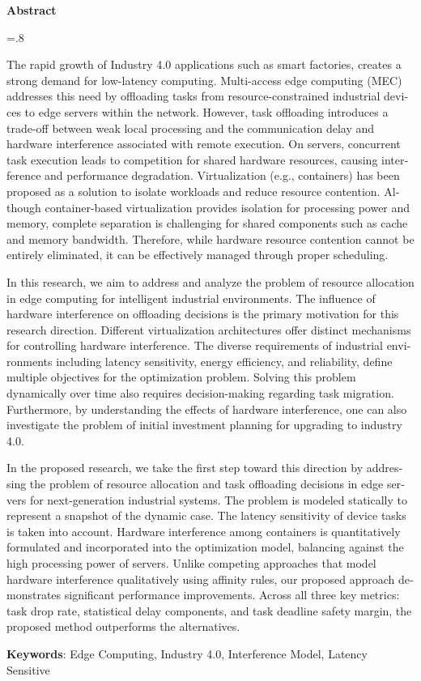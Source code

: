 

\begin{latin}

\begin{center}
\textbf{Abstract}
\end{center}
\baselineskip=.8\baselineskip

The rapid growth of Industry 4.0 applications such as smart factories, creates a strong demand for low-latency computing. Multi-access edge computing (MEC) addresses this need by offloading tasks from resource-constrained industrial devices to edge servers within the network. However, task offloading introduces a trade-off between weak local processing and the communication delay and hardware interference associated with remote execution. On servers, concurrent task execution leads to competition for shared hardware resources, causing interference and performance degradation. Virtualization (e.g., containers) has been proposed as a solution to isolate workloads and reduce resource contention. Although container-based virtualization provides isolation for processing power and memory, complete separation is challenging for shared components such as cache and memory bandwidth. Therefore, while hardware resource contention cannot be entirely eliminated, it can be effectively managed through proper scheduling.

In this research, we aim to address and analyze the problem of resource allocation in edge computing for intelligent industrial environments. The influence of hardware interference on offloading decisions is the primary motivation for this research direction. Different virtualization architectures offer distinct mechanisms for controlling hardware interference. The diverse requirements of industrial environments including latency sensitivity, energy efficiency, and reliability, define multiple objectives for the optimization problem. Solving this problem dynamically over time also requires decision-making regarding task migration. Furthermore, by understanding the effects of hardware interference, one can also investigate the problem of initial investment planning for upgrading to industry 4.0.

In the proposed research, we take the first step toward this direction by addressing the problem of resource allocation and task offloading decisions in edge servers for next-generation industrial systems. The problem is modeled statically to represent a snapshot of the dynamic case. The latency sensitivity of device tasks is taken into account. Hardware interference among containers is quantitatively formulated and incorporated into the optimization model, balancing against the high processing power of servers. Unlike competing approaches that model hardware interference qualitatively using affinity rules, our proposed approach demonstrates significant performance improvements. Across all three key metrics: task drop rate, statistical delay components, and task deadline safety margin, the proposed method outperforms the alternatives.

\bigskip\noindent\textbf{Keywords}: Edge Computing, Industry 4.0, Interference Model, Latency Sensitive

\end{latin}
